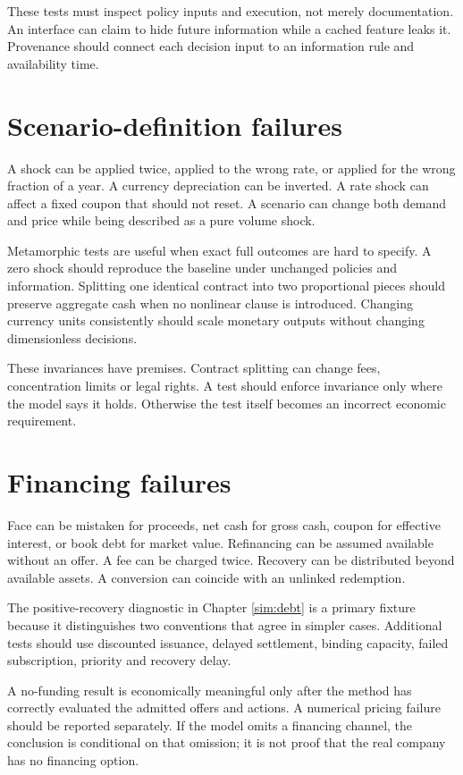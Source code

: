 These tests must inspect policy inputs and execution, not merely documentation. An interface can claim to hide future information while a cached feature leaks it. Provenance should connect each decision input to an information rule and availability time.

\section{Scenario-definition failures}
A shock can be applied twice, applied to the wrong rate, or applied for the wrong fraction of a year. A currency depreciation can be inverted. A rate shock can affect a fixed coupon that should not reset. A scenario can change both demand and price while being described as a pure volume shock.

Metamorphic tests are useful when exact full outcomes are hard to specify. A zero shock should reproduce the baseline under unchanged policies and information. Splitting one identical contract into two proportional pieces should preserve aggregate cash when no nonlinear clause is introduced. Changing currency units consistently should scale monetary outputs without changing dimensionless decisions.

These invariances have premises. Contract splitting can change fees, concentration limits or legal rights. A test should enforce invariance only where the model says it holds. Otherwise the test itself becomes an incorrect economic requirement.

\section{Financing failures}
Face can be mistaken for proceeds, net cash for gross cash, coupon for effective interest, or book debt for market value. Refinancing can be assumed available without an offer. A fee can be charged twice. Recovery can be distributed beyond available assets. A conversion can coincide with an unlinked redemption.

The positive-recovery diagnostic in Chapter \ref{sim:debt} is a primary fixture because it distinguishes two conventions that agree in simpler cases. Additional tests should use discounted issuance, delayed settlement, binding capacity, failed subscription, priority and recovery delay.

A no-funding result is economically meaningful only after the method has correctly evaluated the admitted offers and actions. A numerical pricing failure should be reported separately. If the model omits a financing channel, the conclusion is conditional on that omission; it is not proof that the real company has no financing option.

